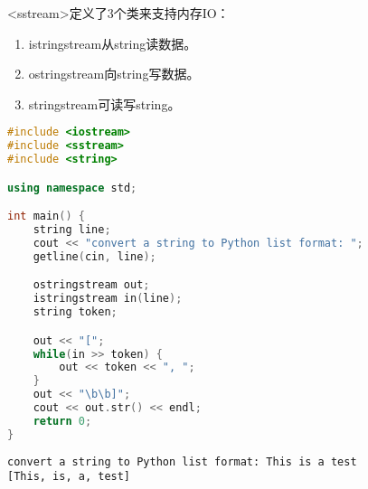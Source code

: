 <sstream>定义了3个类来支持内存IO：

\begin{enumerate}
    \item istringstream从string读数据。
    \item ostringstream向string写数据。
    \item stringstream可读写string。
\end{enumerate}


\begin{lstlisting}[language=C++]
#include <iostream>
#include <sstream>
#include <string>

using namespace std;

int main() {
    string line;
    cout << "convert a string to Python list format: ";
    getline(cin, line);

    ostringstream out;
    istringstream in(line);
    string token;

    out << "[";
    while(in >> token) {
        out << token << ", ";
    }
    out << "\b\b]";
    cout << out.str() << endl;
    return 0;
}
\end{lstlisting}

\begin{tcolorbox}
	\begin{verbatim}
convert a string to Python list format: This is a test
[This, is, a, test]
	\end{verbatim}
\end{tcolorbox}

\newpage